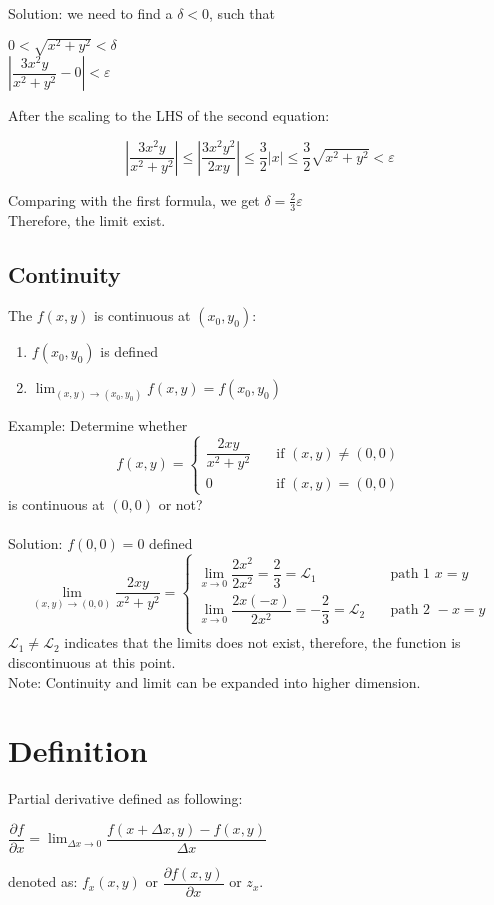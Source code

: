 \documentclass[UTF8,a4paper, 10pt, openany]{svmono}
\begin{document}
Solution: we need to find a $\delta <0$, such that
\begin{center}
$0<\sqrt{x^2+y^2}<\delta $\\
$\left|\dfrac{3x^2y }{x^2+y^2}-0\right|<\varepsilon$
\end{center}
After the scaling to the LHS of the second equation:

\[\left|	\dfrac{3x^2y }{x^2+y^2}	\right| \leq \left|\dfrac{3x^2y^2}{2xy}\right| \leq \dfrac{3}{2}|x| \leq \dfrac{3}{2}\sqrt{x^2+y^2}<\varepsilon \]

Comparing with the first formula, we get $\delta = \frac{2}{3}\varepsilon$\\
Therefore, the limit exist.
\subsection{Continuity}
The $f(x,y)$ is continuous at $(x_0,y_0)$:
\begin{enumerate}
\item $f(x_0,y_0)$ is defined
\item $\displaystyle\lim_{(x,y)\to (x_0,y_0)}f(x,y)=f(x_0,y_0)$
\end{enumerate}
Example: Determine whether\\
\[f(x,y)=\begin{cases}
\dfrac{2xy}{x^2+y^2} & \quad \text{if } (x,y)\neq (0,0)\\
0 & \quad \text{if } (x,y)= (0,0)
\end{cases}\]
is continuous at $(0,0)$ or not?\\ \\
Solution: $f(0,0)=0$ defined
\[\displaystyle\lim_{(x,y)\to (0,0)}\dfrac{2xy}{x^2+y^2}=\begin{cases}
\displaystyle\lim_{x\to 0}\dfrac{2x^2}{2x^2}=\dfrac{2}{3}=\mathcal{L}_1 & \quad \text{path 1 } x=y\\
\displaystyle\lim_{x\to 0}\dfrac{2x(-x)}{2x^2}=-\dfrac{2}{3}=\mathcal{L}_2 & \quad \text{path 2 } -x=y\\
\end{cases}\]
$\mathcal{L}_1\neq \mathcal{L}_2$ indicates that the limits does not exist, therefore, the function is discontinuous at this point.\\
Note: Continuity and limit can be expanded into higher dimension.

\section{Definition}
Partial derivative defined as following:
\begin{center}
$\dfrac{\partial f}{\partial x}=\displaystyle\lim_{\Delta x \to 0}\dfrac{f(x+\Delta x,y)-f(x,y)}{\Delta x}$
\end{center}
denoted as: $f_x(x,y)$ or $\dfrac{\partial f(x,y)}{\partial x}$ or $z_x$.
\end{document}
